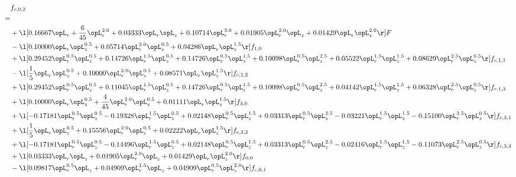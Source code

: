 \begin{alignat}{2} 
\label{eq:f_02_1} 
& f_{c,0,2} \nonumber \\ 
 = \\ 
& + \l[  0.16667 \opL_r + \frac{6}{45} \opL_r^{2.0} +  0.03333 \opL_r \opL_z +  0.10714 \opL_r^{3.0} +  0.01905 \opL_r^{2.0} \opL_z +  0.01429 \opL_r \opL_z^{2.0}  \r] F \nonumber \\ 
& - \l[  0.10000 \opL_r \opL_z^{0.5} +  0.05714 \opL_r^{2.0} \opL_z^{0.5} +  0.04286 \opL_r \opL_z^{1.5}  \r] f_{1,0} \nonumber \\ 
& + \l[  0.29452 \opL_r^{0.5} \opL_z^{0.5} +  0.14726 \opL_r^{1.5} \opL_z^{0.5} +  0.14726 \opL_r^{0.5} \opL_z^{1.5} +  0.10098 \opL_r^{0.5} \opL_z^{2.5} +  0.05522 \opL_r^{1.5} \opL_z^{1.5} +  0.08629 \opL_r^{2.5} \opL_z^{0.5}  \r] f_{c,1,1} \nonumber \\ 
& - \l[ \frac{1}{5} \opL_r \opL_z^{0.5} +  0.10000 \opL_r^{2.0} \opL_z^{0.5} +  0.08571 \opL_r \opL_z^{1.5}  \r] f_{c,1,2} \nonumber \\ 
& + \l[  0.29452 \opL_r^{0.5} \opL_z^{0.5} +  0.11045 \opL_r^{1.5} \opL_z^{0.5} +  0.14726 \opL_r^{0.5} \opL_z^{1.5} +  0.10098 \opL_r^{0.5} \opL_z^{2.5} +  0.04142 \opL_r^{1.5} \opL_z^{1.5} +  0.06328 \opL_r^{2.5} \opL_z^{0.5}  \r] f_{c,1,3} \nonumber \\ 
& + \l[  0.10000 \opL_r \opL_z^{0.5} + \frac{4}{45} \opL_r^{2.0} \opL_z^{0.5} +  0.01111 \opL_r \opL_z^{1.5}  \r] f_{3,0} \nonumber \\ 
& + \l[  -0.17181 \opL_r^{0.5} \opL_z^{0.5}   -0.19328 \opL_r^{1.5} \opL_z^{0.5} +  0.02148 \opL_r^{0.5} \opL_z^{1.5} +  0.03313 \opL_r^{0.5} \opL_z^{2.5}   -0.03221 \opL_r^{1.5} \opL_z^{1.5}   -0.15100 \opL_r^{2.5} \opL_z^{0.5}  \r] f_{c,3,1} \nonumber \\ 
& + \l[ \frac{1}{5} \opL_r \opL_z^{0.5} +  0.15556 \opL_r^{2.0} \opL_z^{0.5} +  0.02222 \opL_r \opL_z^{1.5}  \r] f_{c,3,2} \nonumber \\ 
& + \l[  -0.17181 \opL_r^{0.5} \opL_z^{0.5}   -0.14496 \opL_r^{1.5} \opL_z^{0.5} +  0.02148 \opL_r^{0.5} \opL_z^{1.5} +  0.03313 \opL_r^{0.5} \opL_z^{2.5}   -0.02416 \opL_r^{1.5} \opL_z^{1.5}   -0.11073 \opL_r^{2.5} \opL_z^{0.5}  \r] f_{c,3,3} \nonumber \\ 
& + \l[  0.03333 \opL_r \opL_z +  0.01905 \opL_r^{2.0} \opL_z +  0.01429 \opL_r \opL_z^{2.0}  \r] f_{0,0} \nonumber \\ 
& - \l[  0.09817 \opL_r^{0.5} \opL_z +  0.04909 \opL_r^{1.5} \opL_z +  0.04909 \opL_r^{0.5} \opL_z^{2.0}  \r] f_{c,0,1} \nonumber \\ 

\end{alignat}
